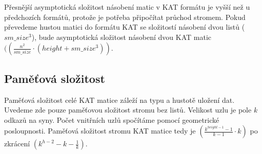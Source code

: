 Přesnější asymptotická složitost násobení matic v KAT formátu je vyšší než u předchozích formátů, protože je potřeba připočítat průchod stromem. Pokud převedeme hustou matici do formátu KAT se složitostí násobení dvou listů \bigO($sm\_size^3$), bude asymptotická složitost násobení dvou KAT matic \bigO$((\frac{n^2}{sm\_size} \cdot (height+sm\_size^3))$.

\subsection{Paměťová složitost}

Paměťová složitost celé KAT matice záleží na typu a hustotě uložení dat. Uvedeme zde pouze paměťovou složitost stromu bez listů. Velikost uzlu je pole $k$ odkazů na syny. Počet vnitřních uzlů spočítáme pomocí geometrické posloupnosti. Paměťová složitost stromu KAT matice tedy je \bigO$(\frac{k^{height-1}-1}{k - 1} \cdot k)$ po zkrácení \bigO$(k^{h-2}-k-\frac{1}{k})$.